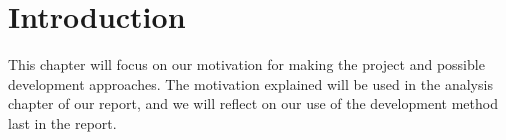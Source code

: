\chapter{Introduction}
\label{cha:introduction}

This chapter will focus on our motivation for making the project and possible development approaches. The motivation explained will be used in the analysis chapter of our report, and we will reflect on our use of the development method last in the report.\newpage

%

